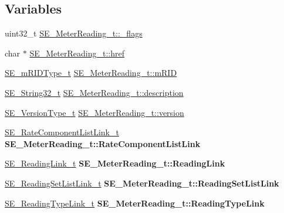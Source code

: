 \subsection*{Variables}
\begin{DoxyCompactItemize}
\item 
uint32\+\_\+t \hyperlink{group__MeterReading_gad50fcf205c0820ea247fdbbb80b37059}{S\+E\+\_\+\+Meter\+Reading\+\_\+t\+::\+\_\+flags}
\item 
char $\ast$ \hyperlink{group__MeterReading_ga30eb76165fc6629c2c745e52f5fb3a43}{S\+E\+\_\+\+Meter\+Reading\+\_\+t\+::href}
\item 
\hyperlink{group__mRIDType_gac74622112f3a388a2851b2289963ba5e}{S\+E\+\_\+m\+R\+I\+D\+Type\+\_\+t} \hyperlink{group__MeterReading_ga53cdec433d7f97a25a229b7bd70be53e}{S\+E\+\_\+\+Meter\+Reading\+\_\+t\+::m\+R\+ID}
\item 
\hyperlink{group__String32_gac9f59b06b168b4d2e0d45ed41699af42}{S\+E\+\_\+\+String32\+\_\+t} \hyperlink{group__MeterReading_ga1d70f306503559815110dbf7512e1997}{S\+E\+\_\+\+Meter\+Reading\+\_\+t\+::description}
\item 
\hyperlink{group__VersionType_ga4b8d27838226948397ed99f67d46e2ae}{S\+E\+\_\+\+Version\+Type\+\_\+t} \hyperlink{group__MeterReading_ga5c1340f98b639840610b8b0ec3fd0eaa}{S\+E\+\_\+\+Meter\+Reading\+\_\+t\+::version}
\item 
\mbox{\label{group__MeterReading_ga10940fa20f126bd3700eee733319aec9}} 
\hyperlink{structSE__RateComponentListLink__t}{S\+E\+\_\+\+Rate\+Component\+List\+Link\+\_\+t} {\bfseries S\+E\+\_\+\+Meter\+Reading\+\_\+t\+::\+Rate\+Component\+List\+Link}
\item 
\mbox{\label{group__MeterReading_gacc0ee137a12938e393983a28b6c1a15f}} 
\hyperlink{structSE__ReadingLink__t}{S\+E\+\_\+\+Reading\+Link\+\_\+t} {\bfseries S\+E\+\_\+\+Meter\+Reading\+\_\+t\+::\+Reading\+Link}
\item 
\mbox{\label{group__MeterReading_ga863b678967d00fc7571991b32dd3548b}} 
\hyperlink{structSE__ReadingSetListLink__t}{S\+E\+\_\+\+Reading\+Set\+List\+Link\+\_\+t} {\bfseries S\+E\+\_\+\+Meter\+Reading\+\_\+t\+::\+Reading\+Set\+List\+Link}
\item 
\mbox{\label{group__MeterReading_gaf69e1d0450490cbe3d1d48ae11eafa47}} 
\hyperlink{structSE__ReadingTypeLink__t}{S\+E\+\_\+\+Reading\+Type\+Link\+\_\+t} {\bfseries S\+E\+\_\+\+Meter\+Reading\+\_\+t\+::\+Reading\+Type\+Link}
\end{DoxyCompactItemize}


